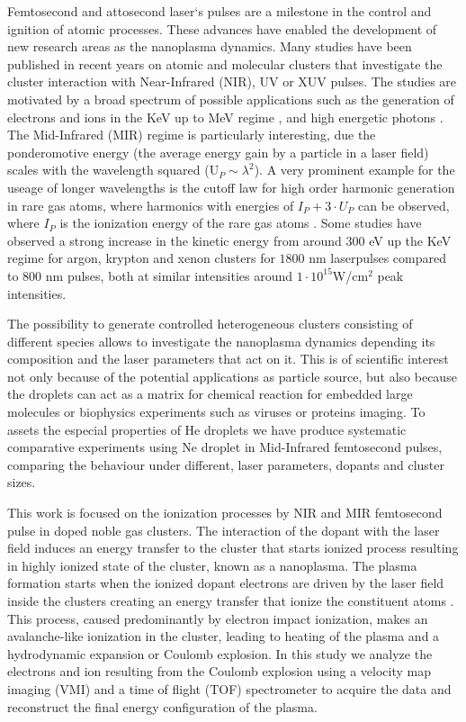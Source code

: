 Femtosecond and attosecond laser`s pulses are a milestone in the control and ignition of atomic processes. These advances have enabled the development of new research areas as the nanoplasma dynamics. Many studies have been published in recent years on atomic and molecular clusters that investigate the cluster interaction with Near-Infrared (NIR), UV or XUV pulses\cite{stebbings_generation_2011}. The studies are motivated by a broad spectrum of possible applications such as the generation of electrons and ions in the KeV up to MeV regime \cite{fennel_laser-driven_2010}, and high energetic photons \cite{schutte_strong-field_2016}
.  
The Mid-Infrared (MIR) regime is particularly interesting, due the ponderomotive energy (the average energy gain by a particle in a laser field) scales with the wavelength squared (U$_{P}\sim\lambda^{2}$). A very prominent example for the useage of longer wavelengths is the cutoff law for high order harmonic generation in rare gas atoms, where harmonics with energies of $I_P + 3 \cdot U_P$ can be observed, where $I_P$ is the ionization energy of the rare gas atoms \cite{krause_high-order_1992}. Some studies have observed a strong increase in the kinetic energy from around 300 eV up the KeV regime for argon, krypton and xenon clusters for $1800$ nm laserpulses compared to 800 nm pulses, both at similar intensities around $1\cdot10^15 $W/cm$^2$ peak intensities.\cite{schutte_strong-field_2016}

The possibility to generate controlled heterogeneous clusters consisting of different species allows to investigate the nanoplasma dynamics depending its composition and the laser parameters that act on it. This is of scientific interest not only because of the potential applications as particle source, but also because the droplets can act as a matrix for chemical reaction for embedded large molecules or biophysics experiments such as viruses or proteins imaging\cite{stienkemeier_spectroscopy_2006}. To assets the especial properties of He droplets we have produce systematic comparative experiments using Ne droplet in Mid-Infrared femtosecond pulses, comparing the behaviour under different, laser parameters, dopants and cluster sizes.

This work is focused on the ionization processes by NIR and MIR femtosecond pulse in doped noble gas clusters. The interaction of the dopant with the laser field induces an energy transfer to the cluster that starts ionized process resulting in highly ionized state of the cluster, known as a nanoplasma. The plasma formation starts when the ionized dopant electrons are driven by the laser field inside the clusters creating an energy transfer that ionize the constituent atoms \cite{fennel_laser-driven_2010}. This process, caused predominantly by electron impact ionization, makes an avalanche-like ionization in the cluster, leading to heating of the plasma and a hydrodynamic expansion or Coulomb explosion. In this study we analyze the electrons and ion resulting from the Coulomb explosion using a velocity map imaging (VMI) and a time of flight (TOF) spectrometer to acquire the data and reconstruct the final energy configuration of the plasma.

